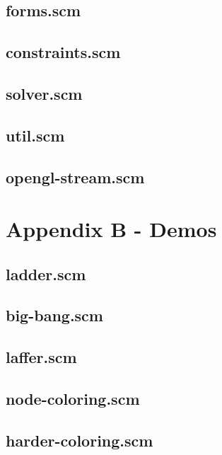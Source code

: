 \documentclass[12pt,a4paper]{article}
\begin{document}
\subsection{forms.scm}

\subsection{constraints.scm}

\subsection{solver.scm}

\subsection{util.scm}

\subsection{opengl-stream.scm}

\newpage

\section{Appendix B - Demos}\label{App:AppendixB}
\subsection{ladder.scm}

\subsection{big-bang.scm}

\subsection{laffer.scm}

\subsection{node-coloring.scm}

\subsection{harder-coloring.scm}

\end{document}
